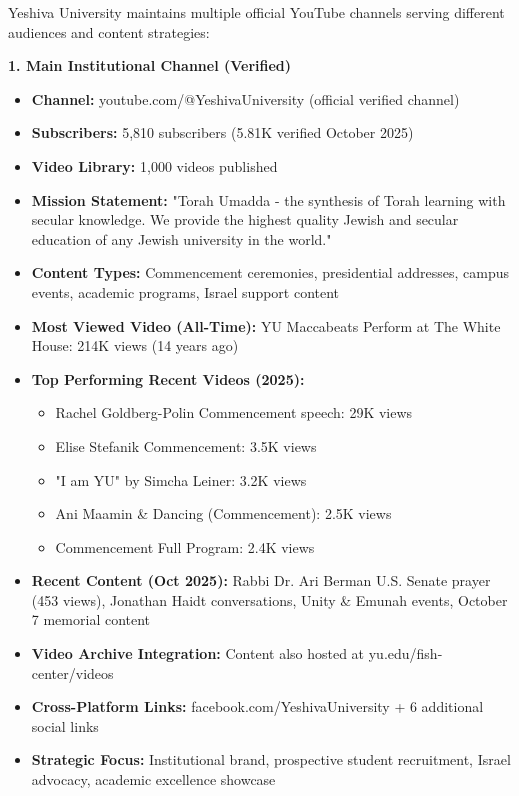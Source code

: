 \documentclass[12pt,letterpaper]{article}
\begin{document}
Yeshiva University maintains multiple official YouTube channels serving different audiences and content strategies:

\textbf{1. Main Institutional Channel (Verified)}
\begin{itemize}[leftmargin=*]
    \item \textbf{Channel:} youtube.com/@YeshivaUniversity (official verified channel)
    \item \textbf{Subscribers:} 5,810 subscribers (5.81K verified October 2025)
    \item \textbf{Video Library:} 1,000 videos published
    \item \textbf{Mission Statement:} "Torah Umadda - the synthesis of Torah learning with secular knowledge. We provide the highest quality Jewish and secular education of any Jewish university in the world."
    \item \textbf{Content Types:} Commencement ceremonies, presidential addresses, campus events, academic programs, Israel support content
    \item \textbf{Most Viewed Video (All-Time):} YU Maccabeats Perform at The White House: 214K views (14 years ago)
    \item \textbf{Top Performing Recent Videos (2025):}
    \begin{itemize}
        \item Rachel Goldberg-Polin Commencement speech: 29K views
        \item Elise Stefanik Commencement: 3.5K views
        \item "I am YU" by Simcha Leiner: 3.2K views
        \item Ani Maamin \& Dancing (Commencement): 2.5K views
        \item Commencement Full Program: 2.4K views
    \end{itemize}
    \item \textbf{Recent Content (Oct 2025):} Rabbi Dr. Ari Berman U.S. Senate prayer (453 views), Jonathan Haidt conversations, Unity \& Emunah events, October 7 memorial content
    \item \textbf{Video Archive Integration:} Content also hosted at yu.edu/fish-center/videos
    \item \textbf{Cross-Platform Links:} facebook.com/YeshivaUniversity + 6 additional social links
    \item \textbf{Strategic Focus:} Institutional brand, prospective student recruitment, Israel advocacy, academic excellence showcase
\end{itemize}
\end{document}
